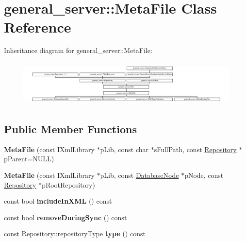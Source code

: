 \hypertarget{classgeneral__server_1_1MetaFile}{\section{general\-\_\-server\-:\-:\-Meta\-File \-Class \-Reference}
\label{classgeneral__server_1_1MetaFile}
}
\-Inheritance diagram for general\-\_\-server\-:\-:\-Meta\-File\-:\begin{figure}[H]
\begin{center}
\leavevmode
\includegraphics[height=2.359550cm]{classgeneral__server_1_1MetaFile}
\end{center}
\end{figure}
\subsection*{\-Public \-Member \-Functions}
\begin{DoxyCompactItemize}
\item 
\hypertarget{classgeneral__server_1_1MetaFile_aabde2f73d288112dac4e45ea5ed89105}{{\bfseries \-Meta\-File} (const \-I\-Xml\-Library $\ast$p\-Lib, const char $\ast$s\-Full\-Path, const \hyperlink{classgeneral__server_1_1Repository}{\-Repository} $\ast$p\-Parent=\-N\-U\-L\-L)}\label{classgeneral__server_1_1MetaFile_aabde2f73d288112dac4e45ea5ed89105}

\item 
\hypertarget{classgeneral__server_1_1MetaFile_a3a28dbf1474df82721036567896902aa}{{\bfseries \-Meta\-File} (const \-I\-Xml\-Library $\ast$p\-Lib, const \hyperlink{classgeneral__server_1_1DatabaseNode}{\-Database\-Node} $\ast$p\-Node, const \hyperlink{classgeneral__server_1_1Repository}{\-Repository} $\ast$p\-Root\-Repository)}\label{classgeneral__server_1_1MetaFile_a3a28dbf1474df82721036567896902aa}

\item 
\hypertarget{classgeneral__server_1_1MetaFile_a84431d7ea6d690345510e25ae6348f05}{const bool {\bfseries include\-In\-X\-M\-L} () const }\label{classgeneral__server_1_1MetaFile_a84431d7ea6d690345510e25ae6348f05}

\item 
\hypertarget{classgeneral__server_1_1MetaFile_a3b7953bfab5e289ad6bc9dc97eababc2}{const bool {\bfseries remove\-During\-Sync} () const }\label{classgeneral__server_1_1MetaFile_a3b7953bfab5e289ad6bc9dc97eababc2}

\item 
\hypertarget{classgeneral__server_1_1MetaFile_abb615359c6d2397da6d2d6ea437c3487}{const \-Repository\-::repository\-Type {\bfseries type} () const }\label{classgeneral__server_1_1MetaFile_abb615359c6d2397da6d2d6ea437c3487}

\end{DoxyCompactItemize}

